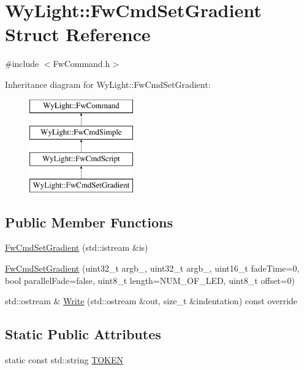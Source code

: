 \hypertarget{struct_wy_light_1_1_fw_cmd_set_gradient}{\section{Wy\-Light\-:\-:Fw\-Cmd\-Set\-Gradient Struct Reference}
\label{struct_wy_light_1_1_fw_cmd_set_gradient}
}


{\ttfamily \#include $<$Fw\-Command.\-h$>$}

Inheritance diagram for Wy\-Light\-:\-:Fw\-Cmd\-Set\-Gradient\-:\begin{figure}[H]
\begin{center}
\leavevmode
\includegraphics[height=4.000000cm]{struct_wy_light_1_1_fw_cmd_set_gradient}
\end{center}
\end{figure}
\subsection*{Public Member Functions}
\begin{DoxyCompactItemize}
\item 
\hyperlink{struct_wy_light_1_1_fw_cmd_set_gradient_a3b9481cbdee4e362825c302dfb73dd62}{Fw\-Cmd\-Set\-Gradient} (std\-::istream \&is)
\item 
\hyperlink{struct_wy_light_1_1_fw_cmd_set_gradient_a1343bc698871f4824bae187943a7fd96}{Fw\-Cmd\-Set\-Gradient} (uint32\-\_\-t argb\-\_, uint32\-\_\-t argb\-\_, uint16\-\_\-t fade\-Time=0, bool parallel\-Fade=false, uint8\-\_\-t length=N\-U\-M\-\_\-\-O\-F\-\_\-\-L\-E\-D, uint8\-\_\-t offset=0)
\item 
std\-::ostream \& \hyperlink{struct_wy_light_1_1_fw_cmd_set_gradient_ab29979311cc5a3e8936d634ece99f78b}{Write} (std\-::ostream \&out, size\-\_\-t \&indentation) const override
\end{DoxyCompactItemize}
\subsection*{Static Public Attributes}
\begin{DoxyCompactItemize}
\item 
static const std\-::string \hyperlink{struct_wy_light_1_1_fw_cmd_set_gradient_a2e00c35a708bdd084af9fa486bdbd83e}{T\-O\-K\-E\-N}
\end{DoxyCompactItemize}
